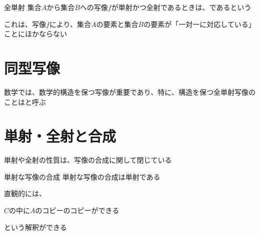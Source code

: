 \documentclass[../../../topic_mapping]{subfiles}
\begin{document}
\begin{definition}{全単射}
  集合$A$から集合$B$への写像$f$が単射かつ全射であるときは、であるという
\end{definition}

これは、写像$f$により、集合$A$の要素と集合$B$の要素が「一対一に対応している」ことにほかならない

\sectionline
\section{同型写像}

数学では、数学的構造を保つ写像が重要であり、特に、構造を保つ全単射写像のことはと呼ぶ

\sectionline
\section{単射・全射と合成}

単射や全射の性質は、写像の合成に関して閉じている

\br

\begin{theorem}{単射な写像の合成}
  単射な写像の合成は単射である
\end{theorem}

直観的には、
\begin{shaded}
  $C$の中に$A$のコピーのコピーができる
\end{shaded}
という解釈ができる
\end{document}

